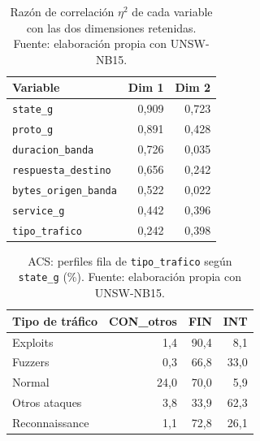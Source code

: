 \begin{table}[htbp]
  \centering
  \caption[Eta$^2$ de cada variable del ACM]{Razón de correlación $\eta^2$ de cada variable con las dos dimensiones retenidas. Fuente: elaboración propia con UNSW-NB15.}\label{tab:a-acm-eta}
  \begin{tablacompacta}
  \begin{tabular}{lrr}
    \toprule
    Variable & Dim 1 & Dim 2 \\
    \midrule
    \texttt{state\_g} & 0,909 & 0,723 \\
    \texttt{proto\_g} & 0,891 & 0,428 \\
    \texttt{duracion\_banda} & 0,726 & 0,035 \\
    \texttt{respuesta\_destino} & 0,656 & 0,242 \\
    \texttt{bytes\_origen\_banda} & 0,522 & 0,022 \\
    \texttt{service\_g} & 0,442 & 0,396 \\
    \texttt{tipo\_trafico} & 0,242 & 0,398 \\
    \bottomrule
  \end{tabular}
  \end{tablacompacta}
\end{table}

\begin{table}[htbp]
  \centering
  \caption[Perfiles fila del ACS]{ACS: perfiles fila de \texttt{tipo\_trafico} según \texttt{state\_g} (\%). Fuente: elaboración propia con UNSW-NB15.}\label{tab:a-acs-perfiles}
  \begin{tablacompacta}
  \begin{tabular}{lrrr}
    \toprule
    Tipo de tráfico & CON\_otros & FIN & INT \\
    \midrule
    Exploits & 1,4 & 90,4 & 8,1 \\
    Fuzzers & 0,3 & 66,8 & 33,0 \\
    Normal & 24,0 & 70,0 & 5,9 \\
    Otros ataques & 3,8 & 33,9 & 62,3 \\
    Reconnaissance & 1,1 & 72,8 & 26,1 \\
    \bottomrule
  \end{tabular}
  \end{tablacompacta}
\end{table}
\FloatBarrier
